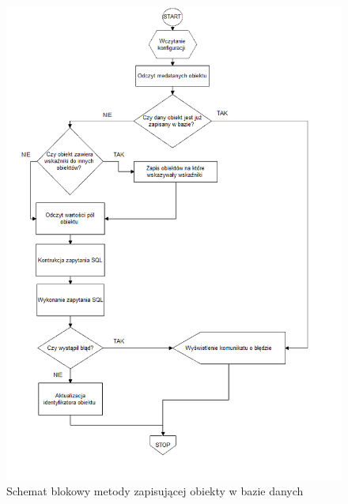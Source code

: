 \documentclass[12pt]{report}
\begin{document}
\newpage
\begin{figure}[H]
\centering
\includegraphics[width=\textwidth]{resources/store_schema.png}
\caption{Schemat blokowy metody zapisującej obiekty w bazie danych}
\end{figure}
\end{document}
